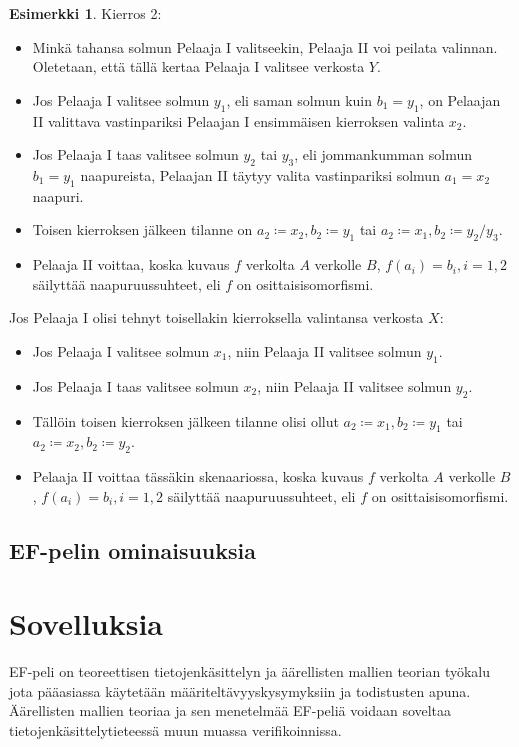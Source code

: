 \documentclass[finnish]{tktltiki2}
\theoremstyle{definition}
\newtheorem{esim}[lau]{Esimerkki}
\theoremstyle{remark}
\begin{document}
\begin{esim}
Kierros 2:
\begin{itemize}
  \item Minkä tahansa solmun Pelaaja I valitseekin, Pelaaja II voi peilata valinnan. Oletetaan, että tällä kertaa Pelaaja I valitsee verkosta $Y$.
  \item Jos Pelaaja I valitsee solmun $y_1$, eli saman solmun kuin $b_1 = y_1$, on Pelaajan II valittava vastinpariksi Pelaajan I ensimmäisen kierroksen valinta $x_2$.
  \item Jos Pelaaja I taas valitsee solmun $y_2$ tai $y_3$, eli jommankumman solmun $b_1 = y_1$ naapureista, Pelaajan II täytyy valita vastinpariksi solmun $a_1 = x_2$ naapuri.
  \item Toisen kierroksen jälkeen tilanne on $a_2 \coloneqq x_2, b_2 \coloneqq y_1$ tai $a_2 \coloneqq x_1, b_2 \coloneqq y_2/y_3$.
  \item Pelaaja II voittaa, koska kuvaus $f$ verkolta $A$ verkolle $B$, $f(a_i) = b_i, i = 1, 2$ säilyttää naapuruussuhteet, eli $f$ on osittaisisomorfismi.
\end{itemize}

Jos Pelaaja I olisi tehnyt toisellakin kierroksella valintansa verkosta $X$:
\begin{itemize}
\item Jos Pelaaja I valitsee solmun $x_1$, niin Pelaaja II valitsee solmun $y_1$.
\item Jos Pelaaja I taas valitsee solmun $x_2$, niin Pelaaja II valitsee solmun $y_2$.
\item Tällöin toisen kierroksen jälkeen tilanne olisi ollut $a_2 \coloneqq x_1, b_2 \coloneqq y_1$ tai $a_2 \coloneqq x_2, b_2 \coloneqq y_2$.
\item Pelaaja II voittaa tässäkin skenaariossa, koska kuvaus $f$ verkolta $A$ verkolle $B$, $f(a_i) = b_i, i = 1, 2$ säilyttää naapuruussuhteet, eli $f$ on osittaisisomorfismi.
\end{itemize}
\end{esim}

\subsection{EF-pelin ominaisuuksia}


\section{Sovelluksia}
EF-peli on teoreettisen tietojenkäsittelyn ja äärellisten mallien teorian työkalu jota pääasiassa käytetään määriteltävyyskysymyksiin ja todistusten apuna. Äärellisten mallien teoriaa ja sen menetelmää EF-peliä voidaan soveltaa tietojenkäsittelytieteessä muun muassa verifikoinnissa. 
\end{document}
